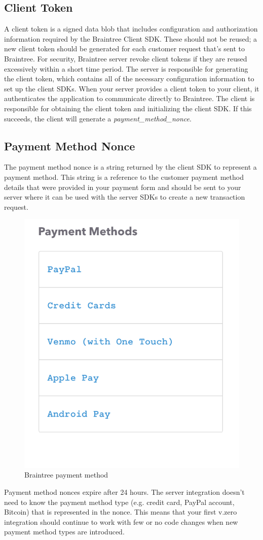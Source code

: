 \subsection{Client Token}
A client token is a signed data blob that includes configuration and authorization information required by the Braintree Client SDK. These should not be reused; a new client token should be generated for each customer request that's sent to Braintree. For security, Braintree server revoke client tokens if they are reused excessively within a short time period.
The server is responsible for generating the client token, which contains all of the necessary configuration information to set up the client SDKs. When your server provides a client token to your client, it authenticates the application to communicate directly to Braintree.
The client is responsible for obtaining the client token and initializing the client SDK. If this succeeds, the client will generate a \emph{payment\_method\_nonce}.
\subsection{Payment Method Nonce}
The payment method nonce is a string returned by the client SDK to represent a payment method. This string is a reference to the customer payment method details that were provided in your payment form and should be sent to your server where it can be used with the server SDKs to create a new transaction request.
\begin{figure}[htb]
  \centering
  \includegraphics[width=0.4\linewidth]{images/chapter2/braintree-payment-method.png}\hfill
  \caption[Braintree payment method]{Braintree payment method}
  \label{fig:braintree_payment_method}
\end{figure}
Payment method nonces expire after 24 hours.
The server integration doesn't need to know the payment method type (e.g. credit card, PayPal account, Bitcoin) that is represented in the nonce. This means that your first v.zero integration should continue to work with few or no code changes when new payment method types are introduced.
